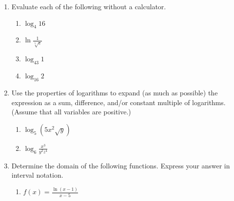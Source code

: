\documentclass[12pt]{article}
\newif\ifans
\begin{document}
\begin{enumerate}

\item Evaluate each of the following without a calculator.

\begin{enumerate}

\item $\displaystyle \log_{4}{16}$

\ifans \fbox{2} \fi

\item $\displaystyle \ln{\frac{1}{\sqrt[5]{e}}}$

\ifans \fbox{$\displaystyle -\frac{1}{5}$}\fi

\item $\displaystyle \log_{43}{1}$

\ifans \fbox{0} \fi

\item $\displaystyle \log_{16}{2}$

\ifans \fbox{$\displaystyle \frac{1}{4}$} \fi

\end{enumerate}

\item Use the properties of logarithms to expand (as much as possible) the expression as a sum, difference, and/or constant multiple of logarithms.  (Assume that all variables are positive.)

\begin{enumerate}

\item $\displaystyle \log_{5}{(5x^{2}\sqrt{y})}$

\ifans \fbox{$\displaystyle 1+2\log_{5}{x}+\frac{1}{2}\log_{5}{y}$} \fi

\item $\displaystyle \log_{6}{\frac{x^3}{y^2z^4}}$

\ifans\fbox{$\displaystyle 3\log_{6}{x}-2\log_{6}{y}-4\log_{6}{z}$}\fi

\end{enumerate}

\item Determine the domain of the following functions.  Express your answer in interval notation.

\begin{enumerate}

\item $f(x)=\frac{\ln{(x-1)}}{x-5}$

\ifans{\fbox{ $(1,5)\cup(5,\infty)$}} \fi


\end{enumerate}
\end{enumerate}
\end{document}
